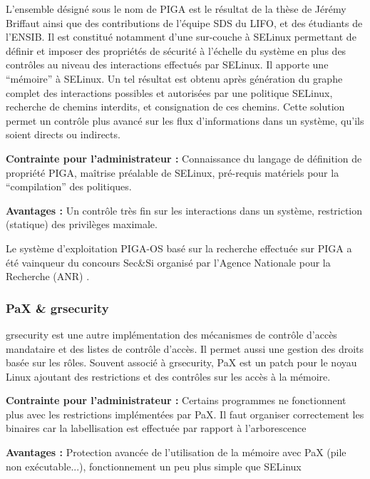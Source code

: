 \documentclass[pdftex,a4paper,titlepage,11pt]{article}
\begin{document}
L'ensemble désigné sous le nom de PIGA est le résultat de la thèse de Jérémy Briffaut ainsi que des contributions de l'équipe SDS du LIFO, et des étudiants de l'ENSIB. Il est constitué notamment d'une sur-couche à SELinux permettant de définir et imposer des propriétés de sécurité à l'échelle du système en plus des contrôles au niveau des interactions effectués par SELinux. Il apporte une ``mémoire'' à SELinux. Un tel résultat est obtenu après génération du graphe complet des interactions possibles et autorisées par une politique SELinux, recherche de chemins interdits, et consignation de ces chemins. Cette solution permet un contrôle plus avancé sur les flux d'informations dans un système, qu'ils soient directs ou indirects.

\begin{list}{}{}
	\item \textbf{Contrainte pour l'administrateur :} Connaissance du langage de définition de propriété PIGA, maîtrise préalable de SELinux, pré-requis matériels pour la ``compilation'' des politiques.
	\item \textbf{Avantages :} Un contrôle très fin sur les interactions dans un système, restriction (statique) des privilèges maximale.
\end{list}

Le système d'exploitation PIGA-OS basé sur la recherche effectuée sur PIGA a été vainqueur du concours Sec\&Si organisé par l'Agence Nationale pour la Recherche (ANR) \cite{PIGASAINTMALO}\cite{PIGAPROP}.

\subsubsection{PaX \& grsecurity}

grsecurity \cite{GRSEC} est une autre implémentation des mécanismes de contrôle d'accès mandataire et des listes de contrôle d'accès. Il permet aussi une gestion des droits basée sur les rôles. Souvent associé à grsecurity, PaX est un patch pour le noyau Linux ajoutant des restrictions et des contrôles sur les accès à la mémoire.

\begin{list}{}{}
	\item \textbf{Contrainte pour l'administrateur :} Certains programmes ne fonctionnent plus avec les restrictions implémentées par PaX. Il faut organiser correctement les binaires car la labellisation est effectuée par rapport à l'arborescence
	\item \textbf{Avantages :} Protection avancée de l'utilisation de la mémoire avec PaX (pile non exécutable...), fonctionnement un peu plus simple que SELinux
\end{list}
\end{document}

